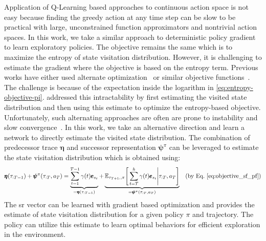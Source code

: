 \documentclass{article}
\theoremstyle{plain}
\theoremstyle{definition}
\theoremstyle{remark}
\begin{document}
Application of Q-Learning based approaches to continuous action space is not easy because finding the greedy action at any time step can be slow to be practical with large, unconstrained function approximators and nontrivial action spaces. 
In this work, we take a similar approach to deterministic policy gradient~\cite{silver2014deterministic} to learn exploratory policies.
The objective remains the same which is to maximize the entropy of state visitation distribution.
However, it is challenging to estimate the gradient where the objective is based on the entropy term. 
Previous works have either used alternate optimization~\cite{pong2019skew,lee2019efficient} or similar objective functions~\cite{guo2021geometric}. 
The challenge is because of the expectation inside the logarithm in \autoref{eq:entropy-objective-pi}. 
\cite{lee2019efficient,pong2019skew} addressed this intractability by first estimating the visited state distribution and then using this estimate to optimize the entropy-based objective.
Unfortunately, such alternating approaches are often are prone to instability and slow convergence~\cite{guo2021geometric}.
In this work, we take an alternative direction and learn a network to directly estimate the visited state distribution.
The combination of predecessor trace $\pmb{\eta}$ and successor representation $\pmb{\psi}^{\pi}$ can be leveraged to estimate the state visitation distribution which is obtained using:
\begin{align}
    \pmb{\eta}(\tau_{:T-1}) + \pmb{\psi}^\pi( \tau_{:T},a_T ) &= \underbrace{\sum_{t=1}^{T-1} \gamma(t) \pmb{e}_{s_t}}_{=\pmb{\eta}(\tau_{:T-1})} + \underbrace{\mathbb{E}_{\tau_{T+1:}, \pi} \Bigg[  \sum_{t=T}^h\gamma(t) \pmb{e}_{s_t} \Bigg| \tau_{:T},a_T \Bigg]}_{=\pmb{\psi}^\pi( \tau_{:T}, a_T )} &\text{(by Eq.~\eqref{eq:objective_sf_pf})} \nonumber \\
\end{align}
The \gls{sr} vector can be learned with gradient based optimization and provides the estimate of state visitation distribution for a given policy $\pi$ and trajectory. 
The policy can utilize this estimate to learn optimal behaviors for efficient exploration in the environment.
\end{document}
